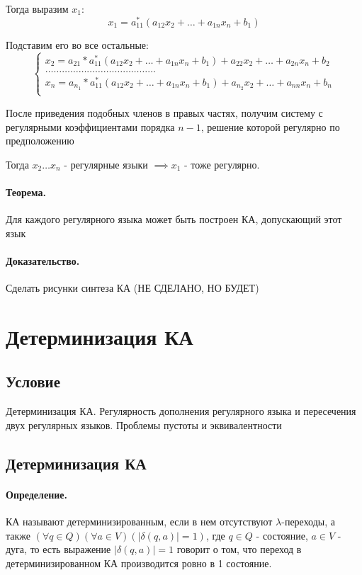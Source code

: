 \documentclass{report}
\begin{document}
Тогда выразим $x_1$:
\[
x_1=a_{11}^{*}(a_{12}x_2+\ldots+a_{1n}x_{n}+b_1)
\] 

Подставим его во все остальные:
\[
\begin{cases}
	x_2=a_{21}*a_{11}^{*}(a_{12}x_2+\ldots+a_{1n}x_{n}+b_1)+a_{22}x_2+\ldots+a_{2n}x_{n}+b_2\\
	\ldots\ldots\ldots\ldots\ldots\ldots\ldots\ldots.\ldots\ldots\ldots\ldots\ldots\\
	x_{n}=a_{n_1}*a_{11}^{*}(a_{12}x_2+\ldots+a_{1n}x_{n}+b_1)+a_{n_2}x_2+\ldots+a_{nn}x_{n}+b_n\\
\end{cases}
\] 

После приведения подобных членов в правых частях, получим систему с регулярными коэффициентами
порядка $n-1$, решение которой регулярно по предположению

Тогда  $x_2\ldots x_{n}$ - регулярные языки $\implies x_1$ - тоже регулярно.

\medskip

\paragraph*{Теорема.}
Для каждого регулярного языка может быть построен КА, допускающий этот язык
\paragraph*{Доказательство.}
Сделать рисунки синтеза КА (НЕ СДЕЛАНО, НО БУДЕТ)

\newpage

\section{Детерминизация КА}
\subsection{Условие}
Детерминизация КА. Регулярность дополнения регулярного языка и пересечения двух
регулярных языков. Проблемы пустоты и эквивалентности

\subsection{Детерминизация КА}
\paragraph*{Определение.}
КА называют детерминизированным, если в нем отсутствуют $\lambda$-переходы, а
также  $(\forall q \in Q)(\forall a \in V)( \mid \delta(q,a) \mid = 1)$, где
$q \in Q$ - состояние, $a \in V$ - дуга, то есть выражение $ \mid \delta(q,a) \mid = 1$ говорит о том,
что переход в детерминизированном КА производится ровно в 1 состояние.
\end{document}
